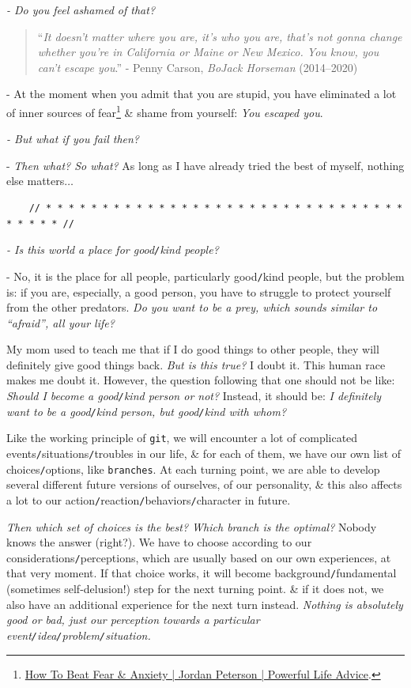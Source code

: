 \documentclass[12pt]{article}
\begin{document}
{\it - Do you feel ashamed of that?}

\begin{quote}
	``{\it It doesn't matter where you are, it's who you are, that's not gonna change whether you're in California or Maine or New Mexico. You know, you can't escape you}.'' - Penny Carson, {\it BoJack Horseman} (2014--2020)
\end{quote}

- At the moment when you admit that you are stupid, you have eliminated a lot of inner sources of fear\footnote{\href{https://www.youtube.com/watch?v=bb9g9mtDHZo}{How To Beat Fear \& Anxiety | Jordan Peterson | Powerful Life Advice}.} \& shame from yourself: {\it You escaped you}.

{\it - But what if you fail then?}

- {\it Then what? So what?} As long as I have already tried the best of myself, nothing else matters$\ldots$

\begin{verbatim}
	// * * * * * * * * * * * * * * * * * * * * * * * * * * * * * * * * * * * * * //
\end{verbatim}

\noindent
{} {\it - Is this world a place for good{\tt/}kind people?}

- No, it is the place for all people, particularly good{\tt/}kind people, but the problem is: if you are, especially, a good person, you have to struggle to protect yourself from the other predators. {\it Do you want to be a prey, which sounds similar to ``afraid'', all your life?} 

My mom used to teach me that if I do good things to other people, they will definitely give good things back. {\it But is this true?} I doubt it. This human race makes me doubt it. However, the question following that one should not be like: {\it Should I become a good{\tt/}kind person or not?} Instead, it should be: {\it I definitely want to be a good{\tt/}kind person, but good{\tt/}kind with whom?}

Like the working principle of {\tt git}, we will encounter a lot of complicated events{\tt/}situations{\tt/}troubles in our life, \& for each of them, we have our own list of choices{\tt/}options, like {\tt branches}. At each turning point, we are able to develop several different future versions of ourselves, of our personality, \& this also affects a lot to our action{\tt/}reaction{\tt/}behaviors{\tt/}character in future.

{\it Then which set of choices is the best? Which branch is the optimal?} Nobody knows the answer (right?). We have to choose according to our considerations{\tt/}perceptions, which are usually based on our own experiences, at that very moment. If that choice works, it will become background{\tt/}fundamental (sometimes self-delusion!) step for the next turning point. \& if it does not, we also have an additional experience for the next turn instead. {\it Nothing is absolutely good or bad, just our perception towards a particular event{\tt/}idea{\tt/}problem{\tt/}situation.}
\end{document}

